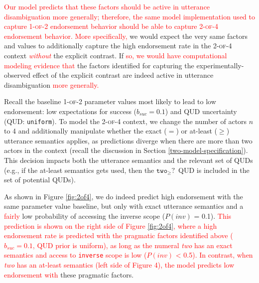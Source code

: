 \documentclass[preprint,authoryear]{elsarticle}\frenchspacing
\newcommand{\lp}[1]{\textcolor{red}{#1}} %
\begin{document}
\lp{Our model predicts that these factors should be active in utterance disambiguation more generally; therefore, the same model implementation used to capture \textsc{1-of-2} endorsement behavior should be able to capture \textsc{2-of-4} endorsement behavior.}
\lp{More specifically,}
we would expect the very same factors and values to additionally capture the high endorsement rate in the \textsc{2-of-4} context \lp{\emph{without}} the explicit contrast. 
If \lp{so, we would have computational modeling evidence that}
the factors identified for capturing the experimentally-observed effect of the explicit contrast are indeed active in utterance disambiguation \lp{more generally.} 



Recall the baseline \textsc{1-of-2} parameter values most likely to lead to low endorsement: low expectations for success ($b_{suc}=0.1$) and QUD uncertainty (QUD: \texttt{uniform}). To model the \textsc{2-of-4} context, we change the number of actors $n$ to 4 and additionally manipulate whether the {exact} ($=$) or {at-least} ($\geq$) utterance semantics applies, as predictions diverge when there are more than two actors in the context (recall the discussion in Section \ref{two-model-specification}). This decision impacts both the utterance semantics and the relevant set of QUDs (e.g., if the at-least semantics gets used, then the $\texttt{two}_{\geq}?$~QUD is included in the set of potential QUDs). 

As shown in Figure \ref{fig:2of4}, we do indeed predict high endorsement with the same parameter value baseline, but only with {exact} utterance semantics and a 
\lp{fairly}
low probability of accessing the inverse scope ($P(inv)$ = 0.1).
\lp{This prediction is shown on the right side of Figure \ref{fig:2of4}, where a high endorsement rate is predicted with the pragmatic factors identified above ($b_{suc}=0.1$, QUD prior is uniform), as long as 
the numeral \textit{two} has an exact semantics and access to \texttt{inverse} scope is low ($P(inv)$ < 0.5).
In contrast, when \textit{two} has an at-least semantics (left side of Figure 4), the model predicts low endorsement with} these pragmatic factors.
\end{document}

